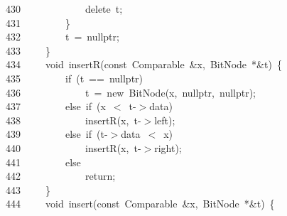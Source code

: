 \documentclass[11pt,a4paper]{ctexart}
\newcommand{\hlstd}[1]{\textcolor[rgb]{0.2,0.2,0.2}{#1}}
\newcommand{\hlopt}[1]{\textcolor[rgb]{0.2,0.2,0.2}{#1}}
\newcommand{\hllin}[1]{\textcolor[rgb]{0.59,0.59,0.59}{#1}}
\newcommand{\hlkwa}[1]{\textcolor[rgb]{0.23,0.42,0.78}{#1}}
\newcommand{\hlkwb}[1]{\textcolor[rgb]{0.63,0,0.31}{#1}}
\newcommand{\hlkwc}[1]{\textcolor[rgb]{0,0.63,0.31}{#1}}
\newcommand{\hlkwd}[1]{\textcolor[rgb]{0.78,0.23,0.41}{#1}}
\begin{document}
\hllin{430\ }\hlstd{}\hlstd{\ \ \ \ \ \ \ \ \ \ \ \ }\hlstd{}\hlkwa{delete\ }\hlstd{t}\hlopt{;}\\
\hllin{431\ }\hlstd{}\hlstd{\ \ \ \ \ \ \ \ }\hlstd{}\hlopt{\}}\\
\hllin{432\ }\hlstd{}\hlstd{\ \ \ \ \ \ \ \ }\hlstd{t\ }\hlopt{=\ }\hlstd{}\hlkwc{nullptr}\hlstd{}\hlopt{;}\\
\hllin{433\ }\hlstd{}\hlstd{\ \ \ \ }\hlstd{}\hlopt{\}}\\
\hllin{434\ }\hlstd{}\hlstd{\ \ \ \ }\hlstd{}\hlkwb{void\ }\hlstd{}\hlkwd{insertR}\hlstd{}\hlopt{(}\hlstd{}\hlkwb{const\ }\hlstd{Comparable\ }\hlopt{\&}\hlstd{x}\hlopt{,\ }\hlstd{BitNode\ }\hlopt{{*}\&}\hlstd{t}\hlopt{)\ \{}\\
\hllin{435\ }\hlstd{}\hlstd{\ \ \ \ \ \ \ \ }\hlstd{}\hlkwa{if\ }\hlstd{}\hlopt{(}\hlstd{t\ }\hlopt{==\ }\hlstd{}\hlkwc{nullptr}\hlstd{}\hlopt{)}\\
\hllin{436\ }\hlstd{}\hlstd{\ \ \ \ \ \ \ \ \ \ \ \ }\hlstd{t\ }\hlopt{=\ }\hlstd{}\hlkwa{new\ }\hlstd{}\hlkwd{BitNode}\hlstd{}\hlopt{(}\hlstd{x}\hlopt{,\ }\hlstd{}\hlkwc{nullptr}\hlstd{}\hlopt{,\ }\hlstd{}\hlkwc{nullptr}\hlstd{}\hlopt{);}\\
\hllin{437\ }\hlstd{}\hlstd{\ \ \ \ \ \ \ \ }\hlstd{}\hlkwa{else\ if\ }\hlstd{}\hlopt{(}\hlstd{x\ }\hlopt{$<$\ }\hlstd{t}\hlopt{{-}$>$}\hlstd{data}\hlopt{)}\\
\hllin{438\ }\hlstd{}\hlstd{\ \ \ \ \ \ \ \ \ \ \ \ }\hlstd{}\hlkwd{insertR}\hlstd{}\hlopt{(}\hlstd{x}\hlopt{,\ }\hlstd{t}\hlopt{{-}$>$}\hlstd{left}\hlopt{);}\\
\hllin{439\ }\hlstd{}\hlstd{\ \ \ \ \ \ \ \ }\hlstd{}\hlkwa{else\ if\ }\hlstd{}\hlopt{(}\hlstd{t}\hlopt{{-}$>$}\hlstd{data\ }\hlopt{$<$\ }\hlstd{x}\hlopt{)}\\
\hllin{440\ }\hlstd{}\hlstd{\ \ \ \ \ \ \ \ \ \ \ \ }\hlstd{}\hlkwd{insertR}\hlstd{}\hlopt{(}\hlstd{x}\hlopt{,\ }\hlstd{t}\hlopt{{-}$>$}\hlstd{right}\hlopt{);}\\
\hllin{441\ }\hlstd{}\hlstd{\ \ \ \ \ \ \ \ }\hlstd{}\hlkwa{else}\\
\hllin{442\ }\hlstd{}\hlstd{\ \ \ \ \ \ \ \ \ \ \ \ }\hlstd{}\hlkwa{return}\hlstd{}\hlopt{;}\\
\hllin{443\ }\hlstd{}\hlstd{\ \ \ \ }\hlstd{}\hlopt{\}}\\
\hllin{444\ }\hlstd{}\hlstd{\ \ \ \ }\hlstd{}\hlkwb{void\ }\hlstd{}\hlkwd{insert}\hlstd{}\hlopt{(}\hlstd{}\hlkwb{const\ }\hlstd{Comparable\ }\hlopt{\&}\hlstd{x}\hlopt{,\ }\hlstd{BitNode\ }\hlopt{{*}\&}\hlstd{t}\hlopt{)\ \{}\\
\end{document}
